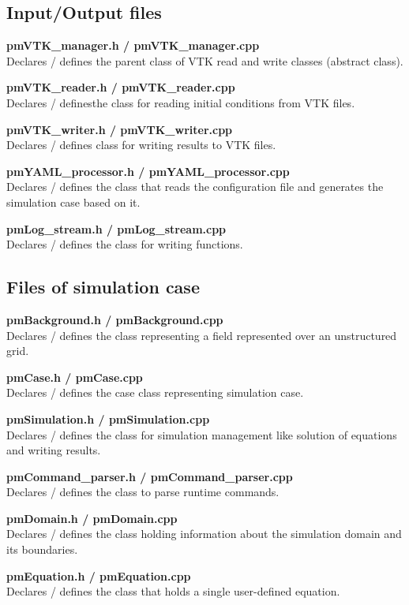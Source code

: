 \documentclass[a4paper,12pt,openany]{book}
\theoremstyle{break}
\begin{document}
\subsection{Input/Output files}

\textbf{pmVTK\_manager.h / pmVTK\_manager.cpp} \\
Declares / defines the parent class of VTK read and write classes (abstract class).

\textbf{pmVTK\_reader.h / pmVTK\_reader.cpp} \\
Declares / definesthe class for reading initial conditions from VTK files.

\textbf{pmVTK\_writer.h / pmVTK\_writer.cpp} \\
Declares / defines class for writing results to VTK files.

\textbf{pmYAML\_processor.h / pmYAML\_processor.cpp} \\
Declares / defines the class that reads the configuration file and generates the simulation case based on it.

\textbf{pmLog\_stream.h / pmLog\_stream.cpp} \\
Declares / defines the class for writing functions.


\subsection{Files of simulation case}

\textbf{pmBackground.h / pmBackground.cpp} \\
Declares / defines the class representing a field represented over an unstructured grid.

\textbf{pmCase.h / pmCase.cpp} \\
Declares / defines the case class representing simulation case.

\textbf{pmSimulation.h / pmSimulation.cpp} \\
Declares / defines the class for simulation management like solution of equations and writing results.

\textbf{pmCommand\_parser.h / pmCommand\_parser.cpp} \\
Declares / defines the class to parse runtime commands.

\textbf{pmDomain.h / pmDomain.cpp} \\
Declares / defines the class holding information about the simulation domain and its boundaries.

\textbf{pmEquation.h / pmEquation.cpp} \\
Declares / defines the class that holds a single user-defined equation.
\end{document}
